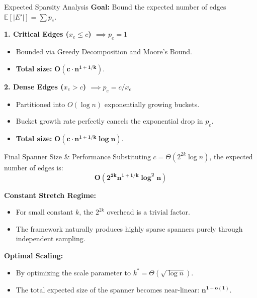\documentclass[10pt]{beamer}
\begin{document}
\begin{frame}{Expected Sparsity Analysis}
    \textbf{Goal:} Bound the expected number of edges $\mathbb{E}[|E'|] = \sum p_e$.
    
    \vspace{0.4cm}
    \textbf{1. Critical Edges ($x_e \le c$) $\implies p_e = 1$}
    \begin{itemize}
        \item Bounded via Greedy Decomposition and Moore's Bound.
        \item \textbf{Total size:} $\mathbf{O(c \cdot n^{1+1/k})}$.
    \end{itemize}

    \vspace{0.6cm}
    \textbf{2. Dense Edges ($x_e > c$) $\implies p_e = c/x_e$}
    \begin{itemize}
        \item Partitioned into $O(\log n)$ exponentially growing buckets.
        \item Bucket growth rate perfectly cancels the exponential drop in $p_e$.
        \item \textbf{Total size:} $\mathbf{O(c \cdot n^{1+1/k} \log n)}$.
    \end{itemize}
\end{frame}

\begin{frame}{Final Spanner Size \& Performance}
    Substituting $c = \Theta(2^{2k} \log n)$, the expected number of edges is:
    \[ \mathbf{O(2^{2k} n^{1+1/k} \log^2 n)} \]
    
    \vspace{0.6cm}
    \textbf{Constant Stretch Regime:}
    \begin{itemize}
        \item For small constant $k$, the $2^{2k}$ overhead is a trivial factor.
        \item The framework naturally produces highly sparse spanners purely through independent sampling.
    \end{itemize}
    
    \vspace{0.4cm}
    \textbf{Optimal Scaling:}
    \begin{itemize}
        \item By optimizing the scale parameter to $k^* = \Theta(\sqrt{\log n})$.
        \item The total expected size of the spanner becomes near-linear: $\mathbf{n^{1+o(1)}}$.
    \end{itemize}
\end{frame}
\end{document}
